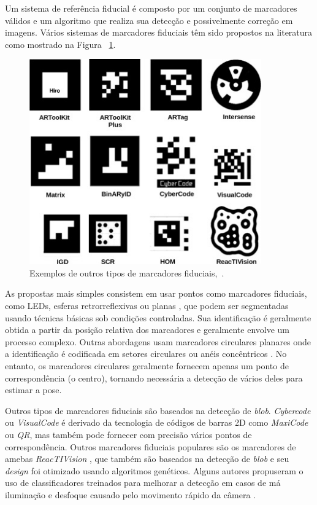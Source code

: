     Um sistema de referência fiducial é composto por um conjunto de marcadores válidos e um algoritmo que realiza sua detecção e possivelmente correção em imagens. Vários sistemas de marcadores fiduciais têm sido propostos na literatura como mostrado na Figura ~\ref{fig:aruco-tipos}.

    \begin{figure}[H]
    	\centering
    	\includegraphics[width=10cm, height=8 cm]{figuras/aruco-tipos.jpg}
    	\caption{Exemplos de outros tipos de marcadores fiduciais,~\cite{Garrido2016}.}
    	\label{fig:aruco-tipos}
    \end{figure}

    As propostas mais simples consistem em usar pontos como marcadores fiduciais, como LEDs, esferas retrorreflexivas ou planas \cite{Klaus1998, Ribo2001}, que podem ser segmentadas usando técnicas básicas sob condições controladas. Sua identificação é geralmente obtida a partir da posição relativa dos marcadores e geralmente envolve um processo complexo. Outras abordagens usam marcadores circulares planares onde a identificação é codificada em setores circulares ou anéis concêntricos \cite{Measurements1998, Naimark2002}. No entanto, os marcadores circulares geralmente fornecem apenas um ponto de correspondência (o centro), tornando necessária a detecção de vários deles para estimar a pose.

    Outros tipos de marcadores fiduciais são baseados na detecção de \textit{blob}. \textit{Cybercode} \cite{Rekimoto2000} ou \textit{VisualCode} \cite{Michael2004} é derivado da tecnologia de códigos de barras 2D como \textit{MaxiCode} ou \textit{QR}, mas também pode fornecer com precisão vários pontos de correspondência. Outros marcadores fiduciais populares são os marcadores de amebas \textit{ReacTIVision} \cite{Kaltenbrunner2007}, que também são baseados na detecção de \textit{blob} e seu \textit{design} foi otimizado usando algoritmos genéticos. Alguns autores propuseram o uso de classificadores treinados para melhorar a detecção em casos de má iluminação e desfoque causado pelo movimento rápido da câmera \cite{Claus2005}.


